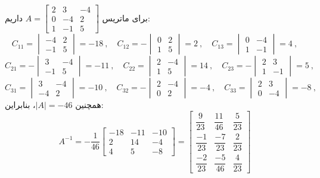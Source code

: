 \begin{example}
	برای ماتریس
	$A=
	\begin{bmatrix}
		2 & 3 & -4 \\
		0 & -4 & 2 \\
		1 & -1 & 5
	\end{bmatrix}$
	داریم:
	\[
	C_{11}=
	\begin{vmatrix}
		-4 & 2 \\
		-1 & 5
	\end{vmatrix} = -18
	\ , \quad
	C_{12}= -
	\begin{vmatrix}
		0 & 2 \\
		1 & 5
	\end{vmatrix} = 2
	\ , \quad
	C_{13}=
	\begin{vmatrix}
		0 & -4 \\
		1 & -1
	\end{vmatrix} = 4
	\ ,
	\]
	\[
	C_{21}= -
	\begin{vmatrix}
		3 & -4 \\
		-1 & 5
	\end{vmatrix} = -11
	\ , \quad
	C_{22}=
	\begin{vmatrix}
		2 & -4 \\
		1 & 5
	\end{vmatrix} = 14
	\ , \quad
	C_{23}= -
	\begin{vmatrix}
		2 & 3 \\
		1 & -1
	\end{vmatrix} = 5
	\ ,
	\]
	\[
	C_{31}=
	\begin{vmatrix}
		3 & -4 \\
		-4 & 2
	\end{vmatrix} = -10
	\ , \quad
	C_{32}= -
	\begin{vmatrix}
		2 & -4 \\
		0 & 2
	\end{vmatrix} = -4
	\ , \quad
	C_{33}=
	\begin{vmatrix}
		2 & 3 \\
		0 & -4
	\end{vmatrix} = -8
	\ ,
	\]
	همچنین
	$|A|=-46$،
	بنابراین:
	\[
	A^{-1} = -\frac{1}{46}
	\begin{bmatrix}
		-18 & -11 & -10 \\
		2 & 14 & -4 \\
		4 & 5 & -8
	\end{bmatrix}
	=
	\begin{bmatrix}
		\dfrac{9}{23} & \dfrac{11}{46} & \dfrac{5}{23} \\
		\dfrac{-1}{23} & \dfrac{-7}{23} & \dfrac{2}{23} \\
		\dfrac{-2}{23} & \dfrac{-5}{46} & \dfrac{4}{23}
	\end{bmatrix}
	\]
\end{example}

